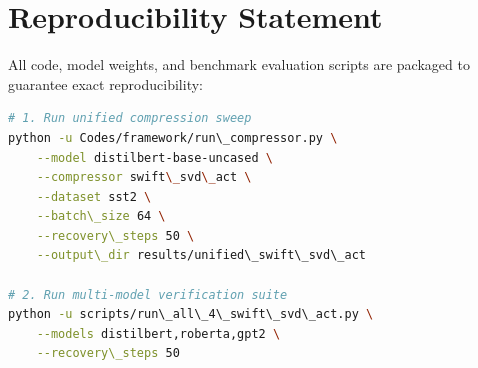 \section{Reproducibility Statement}
All code, model weights, and benchmark evaluation scripts are packaged to guarantee exact reproducibility:
\begin{lstlisting}[language=bash]
# 1. Run unified compression sweep
python -u Codes/framework/run\_compressor.py \
    --model distilbert-base-uncased \
    --compressor swift\_svd\_act \
    --dataset sst2 \
    --batch\_size 64 \
    --recovery\_steps 50 \
    --output\_dir results/unified\_swift\_svd\_act

# 2. Run multi-model verification suite
python -u scripts/run\_all\_4\_swift\_svd\_act.py \
    --models distilbert,roberta,gpt2 \
    --recovery\_steps 50
\end{lstlisting}
